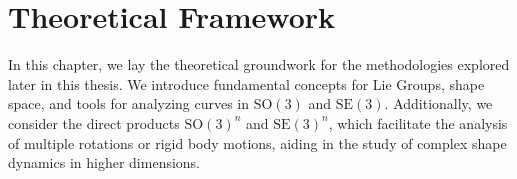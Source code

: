 \chapter{Theoretical Framework}
\label{ch:theoretical-framework}

In this chapter, we lay the theoretical groundwork for the methodologies explored later in this thesis. We introduce fundamental concepts for Lie Groups, shape space, and tools for analyzing curves in \(\mathrm{SO}(3)\) and \(\mathrm{SE}(3)\). Additionally, we consider the direct products \(\mathrm{SO}(3)^n\) and \(\mathrm{SE}(3)^n\), which facilitate the analysis of multiple rotations or rigid body motions, aiding in the study of complex shape dynamics in higher dimensions.



  


   